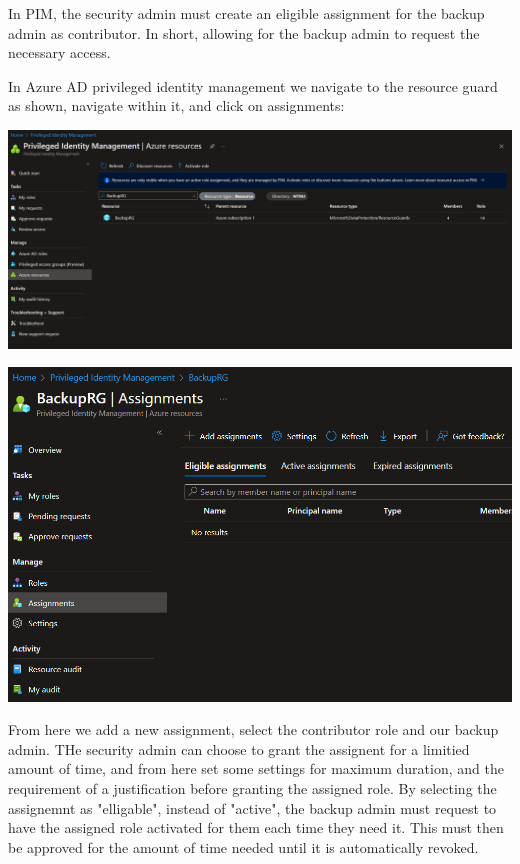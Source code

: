 In PIM, the security admin must create an eligible assignment for the backup admin as contributor. In short, allowing for the backup admin to request the necessary access. 

In Azure AD privileged identity management we navigate to the resource guard as shown, navigate within it, and click on assignments:

\includegraphics[width=.9\linewidth]{figures/RG-PIM.PNG}

\includegraphics[width=.9\linewidth]{figures/RG-assignments.PNG}

From here we add a new assignment, select the contributor role and our backup admin. THe security admin can choose to grant the assignent for a limitied amount of time, and from here set some settings for maximum duration, and the requirement of a justification before granting the assigned role. By selecting the assignemnt as "elligable", instead of "active", the backup admin must request to have the assigned role activated for them each time they need it. This must then be approved for the amount of time needed until it is automatically revoked. 

